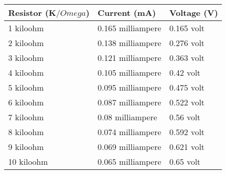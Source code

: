 \begin{tabular}{lll}
\toprule
Resistor (K$/Omega$) & Current (mA) & Voltage (V) \\
\midrule
1 kiloohm & 0.165 milliampere & 0.165 volt \\
2 kiloohm & 0.138 milliampere & 0.276 volt \\
3 kiloohm & 0.121 milliampere & 0.363 volt \\
4 kiloohm & 0.105 milliampere & 0.42 volt \\
5 kiloohm & 0.095 milliampere & 0.475 volt \\
6 kiloohm & 0.087 milliampere & 0.522 volt \\
7 kiloohm & 0.08 milliampere & 0.56 volt \\
8 kiloohm & 0.074 milliampere & 0.592 volt \\
9 kiloohm & 0.069 milliampere & 0.621 volt \\
10 kiloohm & 0.065 milliampere & 0.65 volt \\
\bottomrule
\end{tabular}
